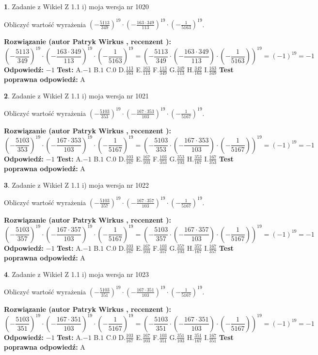 \documentclass[12pt, a4paper]{article}
\theoremstyle{definition} %
\newtheorem{zad}{}
\newcommand{\zadStart}[1]{\begin{zad}#1\newline}
\newcommand{\zadStop}{\end{zad}}
\newcommand{\rozwStart}[2]{\noindent \textbf{Rozwiązanie (autor #1 , recenzent #2): }\newline}
\newcommand{\rozwStop}{\newline}
\newcommand{\odpStart}{\noindent \textbf{Odpowiedź:}\newline}
\newcommand{\odpStop}{\newline}
\newcommand{\testStart}{\noindent \textbf{Test:}\newline}
\newcommand{\testStop}{\newline}
\newcommand{\kluczStart}{\noindent \textbf{Test poprawna odpowiedź:}\newline}
\newcommand{\kluczStop}{\newline}
\begin{document}
\zadStart{Zadanie z Wikieł Z 1.1 i) moja wersja nr 1020}

Obliczyć wartość wyrażenia $(-\frac{5113}{349})^{19} \cdot (-\frac{163 \cdot 349}{113})^{19} \cdot (-\frac{1}{5163})^{19}$.
\zadStop
\rozwStart{Patryk Wirkus}{}
$$(-\frac{5113}{349})^{19} \cdot (-\frac{163 \cdot 349}{113})^{19} \cdot (-\frac{1}{5163})^{19} = (-\frac{5113}{349} \cdot (-\frac{163 \cdot 349}{113}) \cdot (-\frac{1}{5163}))^{19} = (-1)^{19} = -1$$
\rozwStop
\odpStart
$-1$
\odpStop
\testStart
A.$-1$ B.$1$ C.$0$ D.$\frac{113}{163}$ E.$\frac{163}{113}$
F.$\frac{113}{349}$ G.$\frac{349}{113}$
H.$\frac{349}{163}$
I.$\frac{163}{349}$
\testStop
\kluczStart
A
\kluczStop



\zadStart{Zadanie z Wikieł Z 1.1 i) moja wersja nr 1021}

Obliczyć wartość wyrażenia $(-\frac{5103}{353})^{19} \cdot (-\frac{167 \cdot 353}{103})^{19} \cdot (-\frac{1}{5167})^{19}$.
\zadStop
\rozwStart{Patryk Wirkus}{}
$$(-\frac{5103}{353})^{19} \cdot (-\frac{167 \cdot 353}{103})^{19} \cdot (-\frac{1}{5167})^{19} = (-\frac{5103}{353} \cdot (-\frac{167 \cdot 353}{103}) \cdot (-\frac{1}{5167}))^{19} = (-1)^{19} = -1$$
\rozwStop
\odpStart
$-1$
\odpStop
\testStart
A.$-1$ B.$1$ C.$0$ D.$\frac{103}{167}$ E.$\frac{167}{103}$
F.$\frac{103}{353}$ G.$\frac{353}{103}$
H.$\frac{353}{167}$
I.$\frac{167}{353}$
\testStop
\kluczStart
A
\kluczStop



\zadStart{Zadanie z Wikieł Z 1.1 i) moja wersja nr 1022}

Obliczyć wartość wyrażenia $(-\frac{5103}{357})^{19} \cdot (-\frac{167 \cdot 357}{103})^{19} \cdot (-\frac{1}{5167})^{19}$.
\zadStop
\rozwStart{Patryk Wirkus}{}
$$(-\frac{5103}{357})^{19} \cdot (-\frac{167 \cdot 357}{103})^{19} \cdot (-\frac{1}{5167})^{19} = (-\frac{5103}{357} \cdot (-\frac{167 \cdot 357}{103}) \cdot (-\frac{1}{5167}))^{19} = (-1)^{19} = -1$$
\rozwStop
\odpStart
$-1$
\odpStop
\testStart
A.$-1$ B.$1$ C.$0$ D.$\frac{103}{167}$ E.$\frac{167}{103}$
F.$\frac{103}{357}$ G.$\frac{357}{103}$
H.$\frac{357}{167}$
I.$\frac{167}{357}$
\testStop
\kluczStart
A
\kluczStop



\zadStart{Zadanie z Wikieł Z 1.1 i) moja wersja nr 1023}

Obliczyć wartość wyrażenia $(-\frac{5103}{351})^{19} \cdot (-\frac{167 \cdot 351}{103})^{19} \cdot (-\frac{1}{5167})^{19}$.
\zadStop
\rozwStart{Patryk Wirkus}{}
$$(-\frac{5103}{351})^{19} \cdot (-\frac{167 \cdot 351}{103})^{19} \cdot (-\frac{1}{5167})^{19} = (-\frac{5103}{351} \cdot (-\frac{167 \cdot 351}{103}) \cdot (-\frac{1}{5167}))^{19} = (-1)^{19} = -1$$
\rozwStop
\odpStart
$-1$
\odpStop
\testStart
A.$-1$ B.$1$ C.$0$ D.$\frac{103}{167}$ E.$\frac{167}{103}$
F.$\frac{103}{351}$ G.$\frac{351}{103}$
H.$\frac{351}{167}$
I.$\frac{167}{351}$
\testStop
\kluczStart
A
\kluczStop
\end{document}
